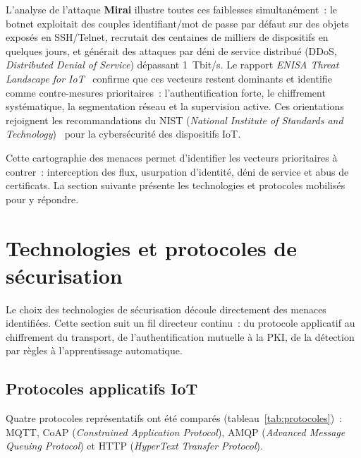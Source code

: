 L'analyse de l'attaque \textbf{Mirai} illustre toutes ces faiblesses simultanément~: le botnet exploitait des couples identifiant/mot de passe par défaut sur des objets exposés en SSH/Telnet, recrutait des centaines de milliers de dispositifs en quelques jours, et générait des attaques par déni de service distribué (DDoS, \emph{Distributed Denial of Service}) dépassant 1~Tbit/s. Le rapport \emph{ENISA Threat Landscape for IoT}~\cite{enisa_iot} confirme que ces vecteurs restent dominants et identifie comme contre-mesures prioritaires~: l'authentification forte, le chiffrement systématique, la segmentation réseau et la supervision active. Ces orientations rejoignent les recommandations du NIST (\emph{National Institute of Standards and Technology})~\cite{nist_sp800213} pour la cybersécurité des dispositifs IoT.

Cette cartographie des menaces permet d'identifier les vecteurs prioritaires à contrer~: interception des flux, usurpation d'identité, déni de service et abus de certificats. La section suivante présente les technologies et protocoles mobilisés pour y répondre.

\section{Technologies et protocoles de sécurisation}
\label{sec:ea-protocoles}
\label{sec:tls-dtls-intro}

Le choix des technologies de sécurisation découle directement des menaces identifiées. Cette section suit un fil directeur continu~: du protocole applicatif au chiffrement du transport, de l'authentification mutuelle à la PKI, de la détection par règles à l'apprentissage automatique.

\subsection{Protocoles applicatifs IoT}

Quatre protocoles représentatifs ont été comparés (tableau~\ref{tab:protocoles})~: MQTT, CoAP (\emph{Constrained Application Protocol}), AMQP (\emph{Advanced Message Queuing Protocol}) et HTTP (\emph{HyperText Transfer Protocol}).

